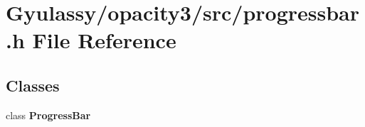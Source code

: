 \section{Gyulassy/opacity3/src/progressbar.h File Reference}
\label{progressbar_8h}
\subsection*{Classes}
\begin{CompactItemize}
\item 
class {\bf ProgressBar}
\end{CompactItemize}
